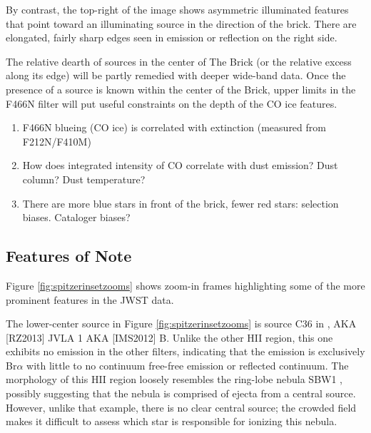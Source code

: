  By contrast, the top-right of the image shows asymmetric illuminated features that point toward an illuminating source in the direction of the brick.
 There are elongated, fairly sharp edges seen in emission or reflection on the right side.
 
The relative dearth of sources in the center of The Brick (or the relative excess along its edge) will be partly remedied with deeper wide-band data.
Once the presence of a source is known within the center of the Brick, upper limits in the F466N filter will put useful constraints on the depth of the CO ice features.

\begin{enumerate} %
    \item F466N blueing (CO ice) is correlated with extinction (measured from F212N/F410M)
    \item How does integrated intensity of CO correlate with dust emission?  Dust column?  Dust temperature?
    \item There are more blue stars in front of the brick, fewer red stars: selection biases.  Cataloger biases?
\end{enumerate}

\subsection{Features of Note}
Figure \ref{fig:spitzerinsetzooms} shows zoom-in frames highlighting some of the more prominent features in the JWST data.



The lower-center source in Figure \ref{fig:spitzerinsetzooms} is source C36 in \citet{Lu2019a}, AKA [RZ2013] JVLA 1 AKA 
 [IMS2012] B.
 Unlike the other HII region, this one exhibits no emission in the other filters, indicating that the emission is exclusively Br$\alpha$ with little to no continuum free-free emission or reflected continuum.
 The morphology of this HII region loosely resembles the ring-lobe nebula SBW1 \citep{Smith2013}, possibly suggesting that the nebula is comprised of ejecta from a central source.
 However, unlike that example, there is no clear central source; the crowded field makes it difficult to assess which star is responsible for ionizing this nebula.
